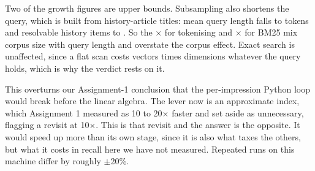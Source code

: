 Two of the growth figures are upper bounds. Subsampling also shortens the query, which is built
from history-article titles: mean query length falls \TokFull{} to \TokSmall{} tokens and
resolvable history items \HistFull{} to \HistSmall{}. So the \BenchTokGrowth$\times$ for tokenising
and \BenchBmGrowth$\times$ for BM25 mix corpus size with query length and overstate the corpus
effect. Exact search is unaffected, since a flat scan costs vectors times dimensions whatever the
query holds, which is why the verdict rests on it.

This overturns our Assignment-1 conclusion that the per-impression Python loop would break
before the linear algebra. The lever now is an approximate index, which Assignment 1 measured as 10
to 20$\times$ faster and set aside as unnecessary, flagging a revisit at 10$\times$. This is that
revisit and the answer is the opposite. It would speed up more than its own stage, since it is also
what taxes the others, but what it costs in recall here we have not measured. Repeated runs on this
machine differ by roughly $\pm$20\%.
